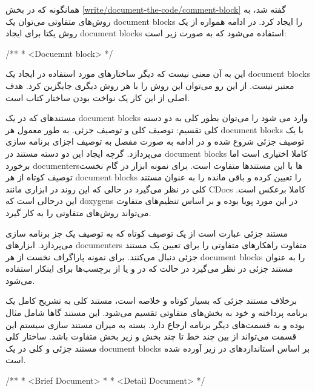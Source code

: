 \begin{note}
همانگونه که در بخش \ref{write/document-the-code/comment-block} گفته شد، به
روش‌های متفاوتی می‌توان یک \glspl{document block} را ایجاد کرد. در ادامه همواره
از یک روش یکتا برای ایجاد \glspl{document block} استفاده می‌شود که به صورت زیر
است:

\begin{Java}
/**
 * <Docuemnt block>
 */
\end{Java}

این به آن معنی نیست که دیگر ساختارهای مورد استفاده در ایجاد یک \glspl{document
block} معتبر نیست. از این رو می‌توان این روش را با هر روش دیگری جایگزین کرد. هدف
اصلی از این کار یک نواخت بودن ساختار کتاب است.
\end{note}

 مستندهای که در یک  \glspl{document block} وارد می شود را می‌توان بطور کلی به دو
دسته کلی تقسیم: توصیف کلی و توصیف جزئی. به طور معمول هر \glspl{document block}
با یک توصیف جزئی شروع شده و در ادامه به صورت مفصل به توصیف اجزای برنامه سازی
می‌پردازد. گرچه ایجاد این دو دسته مستند در \glspl{document block} کاملا اختیاری
است اما برخورد \glspl{documenter}ها با این مستندها متفاوت است. برای نمونه ابزار
 در گام نخست توصیف کوتاه از هر \glspl{document block} را تعیین کرده
و باقی مانده را به عنوان مستند کلی در نظر می‌گیرد در حالی که این روند در ابزاری
مانند \glspl{CDoc} کاملا برعکس است. این درحالی است که \glspl{doxygen} در این
مورد پویا بوده و بر اساس تنظیم‌های متفاوت می‌تواند روش‌های متفاوتی را به کار
گیرد. 

مستند جزئی عبارت است از یک توصیف کوتاه که به توصیف یک جز برنامه سازی می‌پردازد.
ابزارهای \glspl{documenter} متفاوت راهکارهای متفاوتی را برای تعیین یک مستند جزئی
دنبال می‌کنند. برای نمونه  پاراگراف نخست از هر \glspl{document
block} را به عنوان مستند جزئی در نظر می‌گیرد در حالت که در  و یا
 از برچسب‌ها برای اینکار استفاده می‌شود.

برخلاف مستند جزئی که بسیار کوتاه و خلاصه است، مستند کلی به تشریح کامل یک برنامه
پرداخته و خود به بخش‌های متفاوتی تقسیم می‌شود. این مستند گاها شامل مثال بوده و
به قسمت‌های دیگر برنامه ارجاع دارد. بسته به میزان مستند سازی سیستم این قسمت
می‌تواند از بین چند خط تا چند بخش و زیر بخش متفاوت باشد. ساختار کلی مستند جزئی و
کلی در یک \glspl{document block} بر اساس استانداردهای  در زیر آورده
شده است.

\begin{Java}
/**
 * <Brief Document>
 *
 * <Detail Document>
 */
\end{Java}

